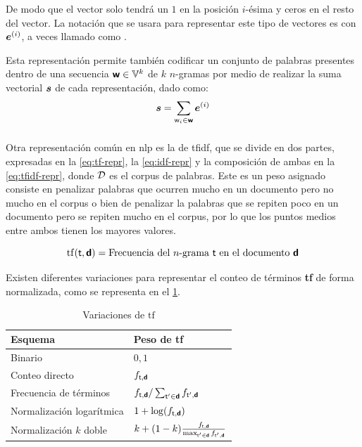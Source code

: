 De modo que el vector solo tendrá un $1$ en la posición $i$-ésima y ceros en el resto del vector. La notación que se usara para representar este tipo de vectores es con ${\bm{e}}^{(i)}$, a veces llamado como .

Esta representación permite también codificar un conjunto de palabras presentes dentro de una secuencia ${\bm{\mathit{\mathsf{w}}}}\in{\mathbb{V}}^{k}$ de $k$ $n$-gramas por medio de realizar la suma vectorial ${\bm{s}}$ de cada representación, dado como:
\begin{equation}
  {\bm{s}} = \sum_{{\mathit{\mathsf{w}}}_i\in{\bm{\mathit{\mathsf{w}}}}} {\bm{e}}^{(i)}
\end{equation}

\subsubsection{}
Otra representación común en \gls{nlp} es la de \gls{tfidf}, que se divide en dos partes, expresadas en la \cref{eq:tf-repr}, la \cref{eq:idf-repr} y la composición de ambas en la \cref{eq:tfidf-repr}, donde $\mathcal{D}$ es el \gls{corpus} de palabras. Este es un peso asignado consiste en penalizar palabras que ocurren mucho en un documento pero no mucho en el \gls{corpus} o bien de penalizar la palabras que se repiten poco en un documento pero se repiten mucho en el \gls{corpus}, por lo que los puntos medios entre ambos tienen los mayores valores.

\begin{equation} \label{eq:tf-repr}
  \mathrm{tf}({\mathit{\mathsf{t}}}, {\bm{\mathit{\mathsf{d}}}}) = \text{Frecuencia del $n$-grama ${\mathit{\mathsf{t}}}$ en el documento ${\bm{\mathit{\mathsf{d}}}}$}
\end{equation}

Existen diferentes variaciones para representar el conteo de términos \textbf{tf} de forma normalizada, como se representa en el \cref{table:tf}.

\begin{table}[h!]
\centering
\begin{tabular}{|l|l|} \hline
  \textbf{Esquema}          & \textbf{Peso de tf} \\ \hline
  Binario                   & $0, 1$ \\ \hline
  Conteo directo            & $f_{{\mathit{\mathsf{t}}}, {\bm{\mathit{\mathsf{d}}}}}$ \\ \hline
  Frecuencia de términos    & $f_{{\mathit{\mathsf{t}}}, {\bm{\mathit{\mathsf{d}}}}} / \sum_{{\mathit{\mathsf{t}}}' \in {\bm{\mathit{\mathsf{d}}}}}f_{{\mathit{\mathsf{t}}}', {\bm{\mathit{\mathsf{d}}}}}$ \\ \hline
  Normalización logarítmica & $1 + \log(f_{{\mathit{\mathsf{t}}}, {\bm{\mathit{\mathsf{d}}}}})$ \\ \hline
  Normalización $k$ doble   & $k + (1 - k) \frac{f_{{\mathit{\mathsf{t}}}, {\bm{\mathit{\mathsf{d}}}}}}{\max_{{\mathit{\mathsf{t}}}^{\prime}\in{\bm{\mathit{\mathsf{d}}}}} f_{{\mathit{\mathsf{t}}}^{\prime}, {\bm{\mathit{\mathsf{d}}}}}}$ \\ \hline
\end{tabular}
\caption{Variaciones de $\mathrm{tf}$}
\label{table:tf}
\end{table}

